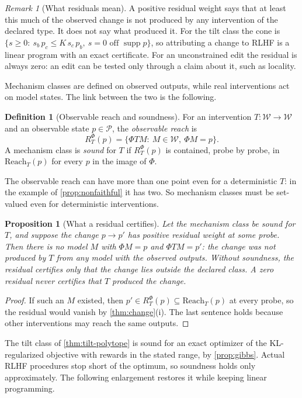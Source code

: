 \documentclass[11pt]{article}
\newtheorem{proposition}[theorem]{Proposition}
\theoremstyle{definition}
\newtheorem{definition}[theorem]{Definition}
\theoremstyle{remark}
\newtheorem{remark}[theorem]{Remark}
\newcommand{\Reach}{\mathrm{Reach}}
\newcommand{\cP}{\mathcal{P}}
\newcommand{\cW}{\mathcal{W}}
\newcommand{\supp}{\operatorname{supp}}
\begin{document}
\begin{remark}[What residuals mean]
A positive residual weight says that at least this much of the observed change is not produced by any
intervention of the declared type. It does not say what produced it. For the tilt class the cone is
$\{s\ge0:\ s_b\,p_c\le K\,s_c\,p_b,\ s=0\text{ off }\supp p\}$, so attributing a change to RLHF is a
linear program with an exact certificate. For an unconstrained edit the residual is always zero: an
edit can be tested only through a claim about it, such as locality.
\end{remark}

Mechanism classes are defined on observed outputs, while real interventions act on model states. The
link between the two is the following.

\begin{definition}[Observable reach and soundness]\label{def:sound}
For an intervention $T\colon\cW\to\cW$ and an observable state $p\in\cP$, the \emph{observable reach}
is
\[
R^\Phi_T(p)=\{\Phi TM:\ M\in\cW,\ \Phi M=p\}.
\]
A mechanism class is \emph{sound} for $T$ if $R^\Phi_T(p)$ is contained, probe by probe, in
$\Reach_T(p)$ for every $p$ in the image of $\Phi$.
\end{definition}

The observable reach can have more than one point even for a deterministic $T$: in the example of
\cref{prop:nonfaithful} it has two. So mechanism classes must be set-valued even for deterministic
interventions.

\begin{proposition}[What a residual certifies]\label{prop:sound}
Let the mechanism class be sound for $T$, and suppose the change $p\to p'$ has positive residual weight
at some probe. Then there is no model $M$ with $\Phi M=p$ and $\Phi TM=p'$: the change was not produced
by $T$ from any model with the observed outputs. Without soundness, the residual certifies only that
the change lies outside the declared class. A zero residual never certifies that $T$ produced the
change.
\end{proposition}
\begin{proof}
If such an $M$ existed, then $p'\in R^\Phi_T(p)\subseteq\Reach_T(p)$ at every probe, so the residual
would vanish by \cref{thm:change}(i). The last sentence holds because other interventions may reach the
same outputs.
\end{proof}

The tilt class of \cref{thm:tilt-polytope} is sound for an exact optimizer of the KL-regularized
objective with rewards in the stated range, by \cref{prop:gibbs}. Actual RLHF procedures stop short of
the optimum, so soundness holds only approximately. The following enlargement restores it while
keeping linear programming.
\end{document}
